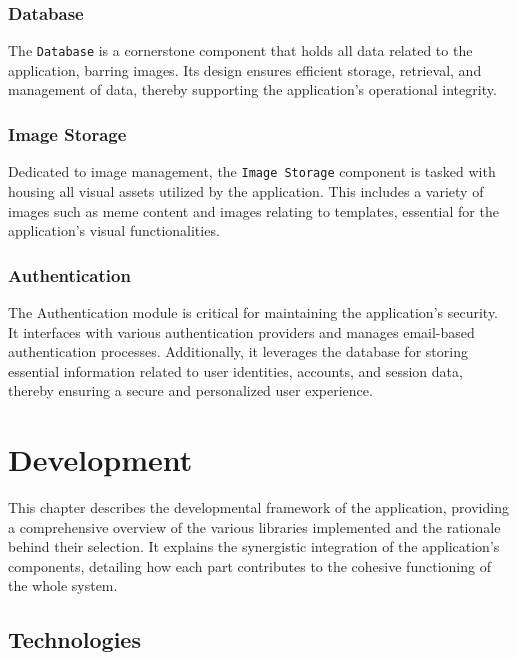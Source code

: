 \subsection{Database}

The \texttt{Database} is a cornerstone component that holds all data related to the application, barring images. Its design ensures efficient storage, retrieval, and management of data, thereby supporting the application's operational integrity.

\subsection{Image Storage}

Dedicated to image management, the \texttt{Image Storage} component is tasked with housing all visual assets utilized by the application. This includes a variety of images such as meme content and images relating to templates, essential for the application's visual functionalities.

\subsection{Authentication}

The Authentication module is critical for maintaining the application's security. It interfaces with various authentication providers and manages email-based authentication processes. Additionally, it leverages the database for storing essential information related to user identities, accounts, and session data, thereby ensuring a secure and personalized user experience.

\chapter{Development}

This chapter describes the developmental framework of the application, providing a comprehensive overview of the various libraries implemented and the rationale behind their selection. It explains the synergistic integration of the application's components, detailing how each part contributes to the cohesive functioning of the whole system.

\section{Technologies}


